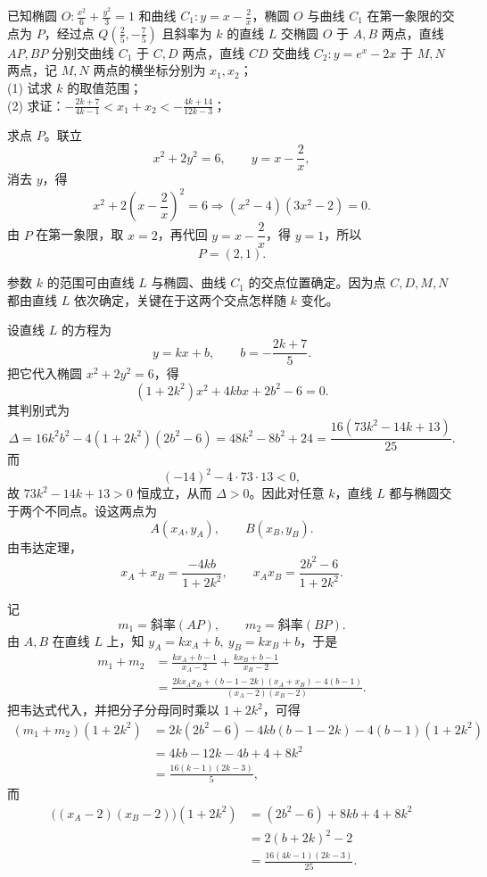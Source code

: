 \begin{example}
已知椭圆 $O: \frac{x^2}{6} + \frac{y^2}{3} = 1$ 和曲线 $C_1: y = x - \frac{2}{x}$，椭圆 $O$ 与曲线 $C_1$ 在第一象限的交点为 $P$，经过点 $Q\left(\frac{2}{5}, -\frac{7}{5}\right)$ 且斜率为 $k$ 的直线 $L$ 交椭圆 $O$ 于 $A,B$ 两点，直线 $AP,BP$ 分别交曲线 $C_1$ 于 $C,D$ 两点，直线 $CD$ 交曲线 $C_2: y = e^x - 2x$ 于 $M,N$ 两点，记 $M,N$ 两点的横坐标分别为 $x_1,x_2$；\\
(1) 试求 $k$ 的取值范围；\\
(2) 求证：$-\frac{2k+7}{4k-1} < x_1 + x_2 < -\frac{4k+14}{12k-3}$；
\end{example}
\begin{solution}
求点 $P$。联立
\[
x^2+2y^2=6,\qquad y=x-\frac{2}{x},
\]
消去 $y$，得
\[
x^2+2\left(x-\frac{2}{x}\right)^2=6
\Longrightarrow
(x^2-4)(3x^2-2)=0.
\]
由 $P$ 在第一象限，取 $x=2$，再代回 $y=x-\dfrac{2}{x}$，得 $y=1$，所以
\[
P=(2,1).
\]

参数 $k$ 的范围可由直线 $L$ 与椭圆、曲线 $C_1$ 的交点位置确定。因为点 $C,D,M,N$ 都由直线 $L$ 依次确定，关键在于这两个交点怎样随 $k$ 变化。

设直线 $L$ 的方程为
\[
y=kx+b,\qquad b=-\frac{2k+7}{5}.
\]
把它代入椭圆 $x^2+2y^2=6$，得
\[
(1+2k^2)x^2+4kbx+2b^2-6=0.
\]
其判别式为
\[
\Delta=16k^2b^2-4(1+2k^2)(2b^2-6)=48k^2-8b^2+24
=\frac{16(73k^2-14k+13)}{25}.
\]
而
\[
(-14)^2-4\cdot 73\cdot 13<0,
\]
故 $73k^2-14k+13>0$ 恒成立，从而 $\Delta>0$。因此对任意 $k$，直线 $L$ 都与椭圆交于两个不同点。设这两点为
\[
A(x_A,y_A),\qquad B(x_B,y_B).
\]
由韦达定理，
\[
x_A+x_B=\frac{-4kb}{1+2k^2},\qquad x_Ax_B=\frac{2b^2-6}{1+2k^2}.
\]

记
\[
m_1=\text{斜率}(AP),\qquad m_2=\text{斜率}(BP).
\]
由 $A,B$ 在直线 $L$ 上，知 $y_A=kx_A+b,\ y_B=kx_B+b$，于是
\begin{align*}
m_1+m_2
&=\frac{kx_A+b-1}{x_A-2}+\frac{kx_B+b-1}{x_B-2}\\
&=\frac{2kx_Ax_B+(b-1-2k)(x_A+x_B)-4(b-1)}{(x_A-2)(x_B-2)}.
\end{align*}
把韦达式代入，并把分子分母同时乘以 $1+2k^2$，可得
\begin{align*}
(m_1+m_2)(1+2k^2)
&=2k(2b^2-6)-4kb(b-1-2k)-4(b-1)(1+2k^2)\\
&=4kb-12k-4b+4+8k^2\\
&=\frac{16(k-1)(2k-3)}{5},
\end{align*}
而
\begin{align*}
\bigl((x_A-2)(x_B-2)\bigr)(1+2k^2)
&=(2b^2-6)+8kb+4+8k^2\\
&=2(b+2k)^2-2\\
&=\frac{16(4k-1)(2k-3)}{25}.
\end{align*}


\end{solution}
